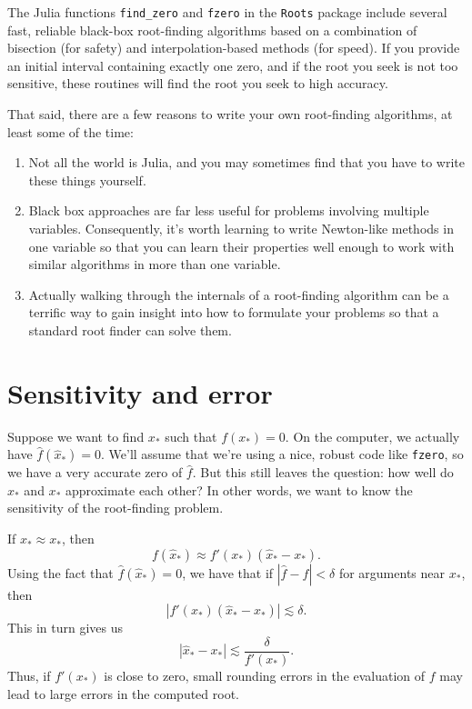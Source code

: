 \documentclass[12pt, leqno]{article} %
\begin{document}
The Julia functions {\tt find\_zero} and {\tt fzero} in the {\tt Roots}
package include several fast, reliable black-box root-finding
algorithms based on a combination of bisection (for safety) and
interpolation-based methods (for speed).  If you provide an initial
interval containing exactly one zero, and if the root you seek is not
too sensitive, these routines will find the root you seek to high
accuracy.

That said, there are a few reasons to write your own root-finding
algorithms, at least some of the time:
\begin{enumerate}
\item
  Not all the world is Julia, and you may sometimes find that you
  have to write these things yourself.
\item
  Black box approaches are far less useful for problems involving
  multiple variables.  Consequently, it's worth learning to write
  Newton-like methods in one variable so that you can learn their
  properties well enough to work with similar algorithms in more than
  one variable.
\item
  Actually walking through the internals of a root-finding algorithm
  can be a terrific way to gain insight into how to formulate your
  problems so that a standard root finder can solve them.
\end{enumerate}

\section*{Sensitivity and error}


Suppose we want to find $x_*$ such that $f(x_*) = 0$.  On the
computer, we actually have $\hat{f}(\hat{x}_*) = 0$.  We'll assume
that we're using a nice, robust code like {\tt fzero}, so we have a
very accurate zero of $\hat{f}$.  But this still leaves the question:
how well do $\hat{x}_*$ and $x_*$ approximate each other?
In other words, we want to know the sensitivity of the root-finding
problem.

If $\hat{x}_* \approx x_*$, then
\[
  f(\hat{x}_*) \approx f'(x_*) (\hat{x}_*-x_*).
\]
Using the fact that $\hat{f}(\hat{x}_*) = 0$, we have that if
$|\hat{f}-f| < \delta$ for arguments near $x_*$, then
\[
  |f'(x_*) (\hat{x}_*-x_*)| \lesssim \delta.
\]
This in turn gives us
\[
  |\hat{x}_*-x_*| \lesssim \frac{\delta}{f'(x_*)}.
\]
Thus, if $f'(x_*)$ is close to zero, small rounding errors in the
evaluation of $f$ may lead to large errors in the computed root.
\end{document}
